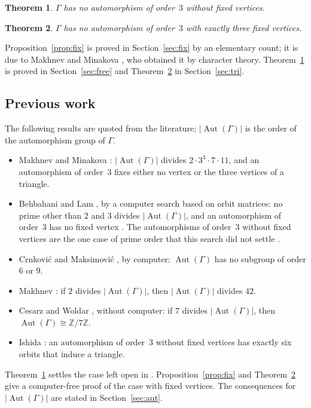 \documentclass[11pt,a4paper]{article}
\newtheorem{theorem}{Theorem}[section]
\theoremstyle{remark}
\newcommand{\ZZ}{\mathbb{Z}}
\newcommand{\Aut}{\operatorname{Aut}}
\newcommand{\oA}{|\Aut(\Gamma)|}
\begin{document}
\begin{theorem}\label{thm:free}
$\Gamma$ has no automorphism of order~$3$ without fixed vertices.
\end{theorem}

\begin{theorem}\label{thm:tri}
$\Gamma$ has no automorphism of order~$3$ with exactly three fixed vertices.
\end{theorem}

Proposition~\ref{prop:fix} is proved in Section~\ref{sec:fix} by an elementary count; it is due to Makhnev and
Minakova \cite{MM04}, who obtained it by character theory. Theorem~\ref{thm:free} is proved in
Section~\ref{sec:free} and Theorem~\ref{thm:tri} in Section~\ref{sec:tri}.

\subsection{Previous work}
The following results are quoted from the
literature; $\oA$ is the order of the automorphism group of $\Gamma$.
\begin{itemize}[leftmargin=*]
\item Makhnev and Minakova \cite{MM04}: $\oA$ divides $2\cdot3^3\cdot7\cdot11$, and an automorphism of order~3 fixes
either no vertex or the three vertices of a triangle.
\item Behbahani and Lam \cite{B09,BL11}, by a computer search based on orbit matrices: no prime other than $2$ and
$3$ divides $\oA$, and an automorphism of order~3 has no fixed vertex \cite[Theorem~4.14]{B09}. The automorphisms of
order~3 without fixed vertices are the one case of prime order that this search did not settle
\cite[Table~21]{B09}.
\item Crnkovi\'c and Maksimovi\'c \cite{CM20}, by computer: $\Aut(\Gamma)$ has no subgroup of order $6$ or $9$.
\item Makhnev \cite[Corollary~2.4]{Mak10}: if $2$ divides $\oA$, then $\oA$ divides $42$.
\item Cesarz and Woldar \cite{CW25}, without computer: if $7$ divides $\oA$, then $\Aut(\Gamma)\cong\ZZ/7\ZZ$.
\item Ishida \cite[Proposition~8.7]{I26}: an automorphism of order~3 without fixed vertices has exactly six orbits
that induce a triangle.
\end{itemize}
Theorem~\ref{thm:free} settles the case left open in \cite{B09,BL11}. Proposition~\ref{prop:fix} and
Theorem~\ref{thm:tri} give a computer-free proof of the case with fixed vertices. The consequences for $\oA$ are
stated in Section~\ref{sec:aut}.
\end{document}
